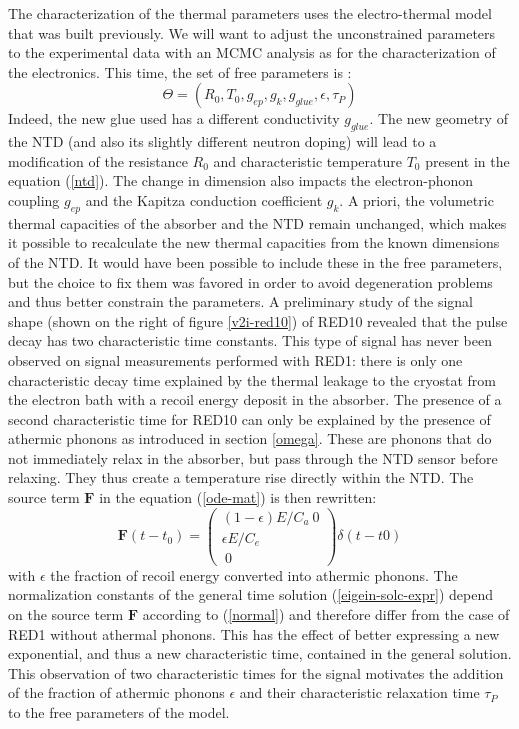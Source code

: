 The characterization of the thermal parameters uses the electro-thermal model that was built previously. We will want to adjust the unconstrained parameters to the experimental data with an MCMC analysis as for the characterization of the electronics. This time, the set of free parameters is :
\begin{equation}
\Theta = (R_0, T_0, g_{ep}, g_k, g_{glue}, \epsilon, \tau_P)
\label{theta-red10}
\end{equation}
Indeed, the new glue used has a different conductivity $g_{glue}$. The new geometry of the NTD (and also its slightly different neutron doping) will lead to a modification of the resistance $R_0$ and characteristic temperature $T_0$ present in the equation (\ref{ntd}). The change in dimension also impacts the electron-phonon coupling $g_{ep}$ and the Kapitza conduction coefficient $g_k$. A priori, the volumetric thermal capacities of the absorber and the NTD remain unchanged, which makes it possible to recalculate the new thermal capacities from the known dimensions of the NTD. It would have been possible to include these in the free parameters, but the choice to fix them was favored in order to avoid degeneration problems and thus better constrain the parameters.
A preliminary study of the signal shape (shown on the right of figure \ref{v2i-red10}) of RED10 revealed that the pulse decay has two characteristic time constants. This type of signal has never been observed on signal measurements performed with RED1: there is only one characteristic decay time explained by the thermal leakage to the cryostat from the electron bath with a recoil energy deposit in the absorber. The presence of a second characteristic time for RED10 can only be explained by the presence of athermic phonons as introduced in section \ref{omega}. These are phonons that do not immediately relax in the absorber, but pass through the NTD sensor before relaxing. They thus create a temperature rise directly within the NTD. The source term $\bm{F}$ in the equation (\ref{ode-mat}) is then rewritten:
\begin{equation}
\bm{F}(t-t_0) = 
\left( \begin{array}{c}
(1-\epsilon)E/C_a \
0 \\
\epsilon E/C_e \\\
0
\end{array} \right) \delta (t-t0)
\end{equation}
with $\epsilon$ the fraction of recoil energy converted into athermic phonons. The normalization constants of the general time solution (\ref{eigein-solc-expr}) depend on the source term $\bm{F}$ according to (\ref{normal}) and therefore differ from the case of RED1 without athermal phonons. This has the effect of better expressing a new exponential, and thus a new characteristic time, contained in the general solution. This observation of two characteristic times for the signal motivates the addition of the fraction of athermic phonons $\epsilon$ and their characteristic relaxation time $\tau_P$ to the free parameters of the model.

